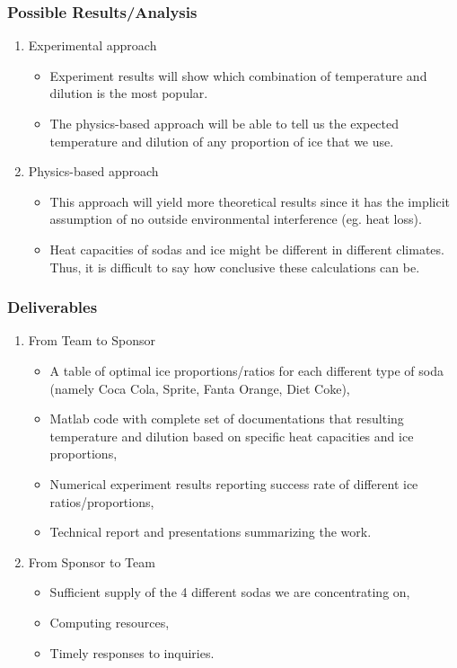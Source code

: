 \documentclass[compress,handout,10pt]{beamer}
\let\olditem\item
\renewcommand{\item}{\setlength{\itemsep}{0.5\baselineskip}\olditem}
\begin{document}
\begin{frame}
    \frametitle{Possible Results/Analysis}
\begin{enumerate}
\item Experimental approach
\begin{itemize}
\item  Experiment results will show which combination of temperature and dilution is the most popular.
\item The physics-based approach will be able to tell us the expected temperature and dilution of any proportion of ice that we use.
\end{itemize}
\item Physics-based approach
\begin{itemize}
\item This approach will yield more theoretical results since it has the implicit assumption of no outside environmental interference (eg. heat loss).
\item Heat capacities of sodas and ice might be different in different climates. Thus, it is difficult to say how conclusive these calculations can be.
\end{itemize}
\end{enumerate}
\end{frame}

\begin{frame}
    \frametitle{Deliverables}
\begin{enumerate}
 \item From Team to Sponsor
\begin{itemize}
    \item A table of optimal ice proportions/ratios for each different type of soda (namely Coca Cola, Sprite, Fanta Orange, Diet Coke),
    \item Matlab code with complete set of documentations that resulting temperature and dilution based on specific heat capacities and ice proportions,
    \item Numerical experiment results reporting success rate of different ice ratios/proportions,
    \item Technical report and presentations summarizing the work. 
\end{itemize}

\item From Sponsor to Team
\begin{itemize}
    \item Sufficient supply of the 4 different sodas we are concentrating on,
    \item Computing resources,
    \item Timely responses to inquiries.
\end{itemize}
\end{enumerate}
\end{frame}
\end{document}
